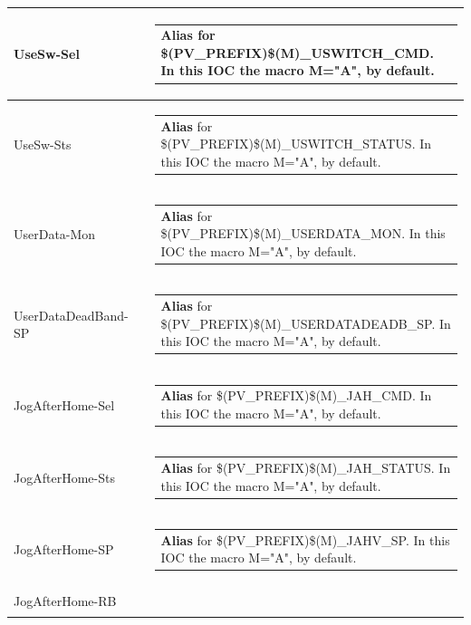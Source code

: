\documentclass[openany]{article}
\begin{document}
\begin{longtable}{| m{4.5cm} m{2.5cm}  m{8.0cm} |}
        UseSw-Sel &  & \begin{tabular}{@{}m{6cm}@{}}
                \textbf{Alias} for \$(PV\_PREFIX)\$(M)\_USWITCH\_CMD. In this IOC the macro M="A", by default.
            \end{tabular} \hypertarget{}{}\\ \hline
        UseSw-Sts &  & \begin{tabular}{@{}m{6cm}@{}}
                \textbf{Alias} for \$(PV\_PREFIX)\$(M)\_USWITCH\_STATUS. In this IOC the macro M="A", by default.
            \end{tabular} \hypertarget{}{}\\ \hline
        UserData-Mon &  & \begin{tabular}{@{}m{6cm}@{}}
                \textbf{Alias} for \$(PV\_PREFIX)\$(M)\_USERDATA\_MON. In this IOC the macro M="A", by default.
            \end{tabular} \hypertarget{}{}\\ \hline
        UserDataDeadBand-SP &  & \begin{tabular}{@{}m{6cm}@{}}
                \textbf{Alias} for \$(PV\_PREFIX)\$(M)\_USERDATADEADB\_SP. In this IOC the macro M="A", by default.
            \end{tabular} \hypertarget{}{}\\ \hline
        JogAfterHome-Sel &  & \begin{tabular}{@{}m{6cm}@{}}
                \textbf{Alias} for \$(PV\_PREFIX)\$(M)\_JAH\_CMD. In this IOC the macro M="A", by default.
            \end{tabular} \hypertarget{}{}\\ \hline
        JogAfterHome-Sts &  & \begin{tabular}{@{}m{6cm}@{}}
                \textbf{Alias} for \$(PV\_PREFIX)\$(M)\_JAH\_STATUS. In this IOC the macro M="A", by default.
            \end{tabular} \hypertarget{}{}\\ \hline
        JogAfterHome-SP &  & \begin{tabular}{@{}m{6cm}@{}}
                \textbf{Alias} for \$(PV\_PREFIX)\$(M)\_JAHV\_SP. In this IOC the macro M="A", by default.
            \end{tabular} \hypertarget{}{}\\ \hline
        JogAfterHome-RB &  & \begin{tabular}{@{}m{6cm}@{}}

\end{tabular}
\end{longtable}
\end{document}
